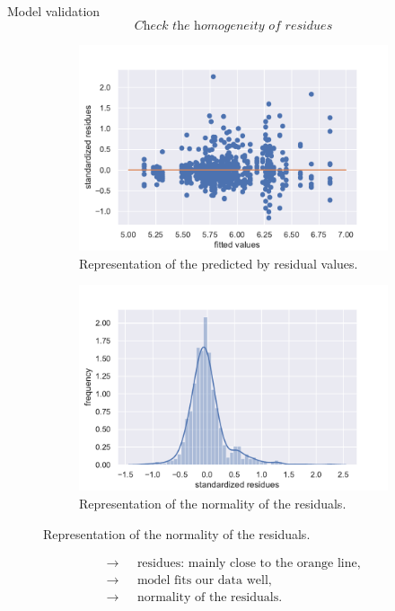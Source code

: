 \documentclass[unknownkeysallowed]{beamer}
\begin{document}
\begin{frame}{Model validation}
\vspace{-0.7cm}
\[\textit{Check the homogeneity of residues}\]
\begin{figure}[H]
\centering
\begin{subfigure}{.5\textwidth}
  \centering
  \includegraphics[width=1\linewidth]{./images/homo_mod2.pdf}
  \caption{Representation of the predicted by residual values.}
\end{subfigure}%
\begin{subfigure}{.5\textwidth}
  \centering
  \includegraphics[width=1\linewidth, clip,trim={0cm 0cm 0cm 0cm} ]{./images/resid_norm_m2.pdf}
  \caption{Representation of the normality of the residuals.}
\end{subfigure}
\end{figure}
\begin{align*}
    \longrightarrow \text{ }& \text{residues: mainly close to the orange line},\\
    \longrightarrow \text{ }& \text{model fits our data well},\\
    \longrightarrow \text{ }& \text{normality of the residuals}.
\end{align*}
\end{frame}
\end{document}

